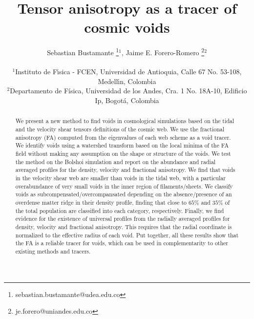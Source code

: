 \documentclass[a4,useAMS,usenatbib,usegraphicx]{mn2e}
\begin{document}
\title{Tensor anisotropy as a tracer of cosmic voids}
\author[S. Bustamante and J.E. Forero-Romero]{
\parbox[t]{\textwidth}{\raggedright 
  Sebastian Bustamante \thanks{sebastian.bustamante@udea.edu.co}$^{1}$,
  Jaime E. Forero-Romero \thanks{je.forero@uniandes.edu.co}$^{2}$ 
}
\vspace*{6pt}\\
$^1$Instituto de F\'{\i}sica - FCEN, Universidad de Antioquia, Calle
67 No. 53-108, Medell\'{\i}n, Colombia\\ 
$^2$Departamento de F\'{i}sica, Universidad de los Andes, Cra. 1
No. 18A-10, Edificio Ip, Bogot\'a, Colombia
}

\maketitle

\begin{abstract}
We present a new method to find voids in cosmological simulations
based on the tidal and the velocity shear tensors
definitions of the cosmic web. 
We use the fractional anisotropy (FA) computed from the eigenvalues
of each web scheme as a void tracer.
We identify voids using a watershed transform based on the local
minima of the FA field without making any assumption on the shape or
structure of the voids.  
We test the method on the Bolshoi simulation and report on the
abundance and radial averaged profiles for the density, velocity and
fractional anisotropy.
We find that voids in the velocity shear web are smaller than voids in
the tidal web, with a particular overabundance of very small voids in
the inner region of filaments/sheets.
We classify voids as subcompensated/overcompansated depending on the
absence/presence of an overdense matter ridge in their density
profile, finding that close to $65\%$ and $35\%$ of the total
population are classified into each category, respectively.
Finally, we find evidence for the existence of universal profiles from
the radially averaged profiles for density, velocity and fractional
anisotropy. 
This requires that the radial coordinate is normalized to the
effective radius of each void. 
Put together, all these results show that the FA is a reliable tracer
for voids, which can be used in complementarity to other existing
methods and tracers.
\end{abstract}
\end{document}
